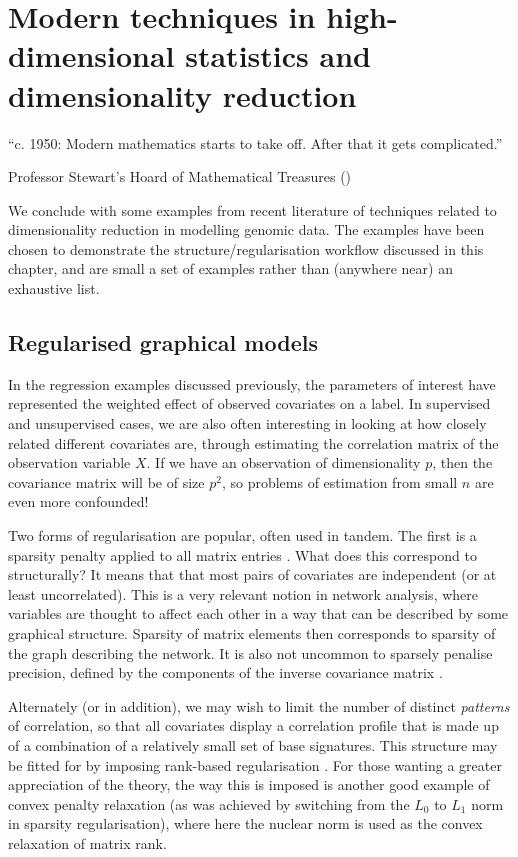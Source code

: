 \documentclass[thesis.tex]{subfiles}
\begin{document}
\section{Modern techniques in high-dimensional statistics and dimensionality reduction}
\epigraph{``c. 1950: Modern mathematics starts to take off. After that it gets complicated.''}{Professor Stewart's Hoard of Mathematical Treasures (\citeyear{stewart_professor_2010})}

We conclude with some examples from recent literature of techniques related to dimensionality reduction in modelling genomic data. The examples have been chosen to  demonstrate the structure/regularisation workflow discussed in this chapter, and are small a set of examples rather than (anywhere near) an exhaustive list.

\subsection{Regularised graphical models}
In the regression examples discussed previously, the parameters of interest have represented the weighted effect of observed covariates on a label. In supervised and unsupervised cases, we are also often interesting in looking at how closely related different covariates are, through estimating the correlation matrix of the observation variable $X$. If we have an observation of dimensionality $p$, then the covariance matrix will be of size $p^2$, so problems of estimation from small $n$ are even more confounded! 

Two forms of regularisation are popular, often used in tandem. The first is a sparsity penalty applied to all matrix entries \citep{witten_covariance-regularized_2009}. What does this correspond to structurally? It means that that most pairs of covariates are independent (or at least uncorrelated). This is a very relevant notion in network analysis, where variables are thought to affect each other in a way that can be described by some graphical structure. Sparsity of matrix elements then corresponds to sparsity of the graph describing the network. It is also not uncommon to sparsely penalise precision, defined by the components of the inverse covariance matrix \citep{xia_positive-definite_2017}. 

Alternately (or in addition), we may wish to limit the number of distinct \textit{patterns} of correlation, so that all covariates display a correlation profile that is made up of a combination of a relatively small set of base signatures. This structure may be fitted for by imposing rank-based regularisation \citep{ye_low-rank_2013, hu_low_2021}. For those wanting a greater appreciation of the theory, the way this is imposed is another good example of convex penalty relaxation (as was achieved by switching from the $L_0$ to $L_1$ norm in sparsity regularisation), where here the nuclear norm is used as the convex relaxation of matrix rank.  
\end{document}
